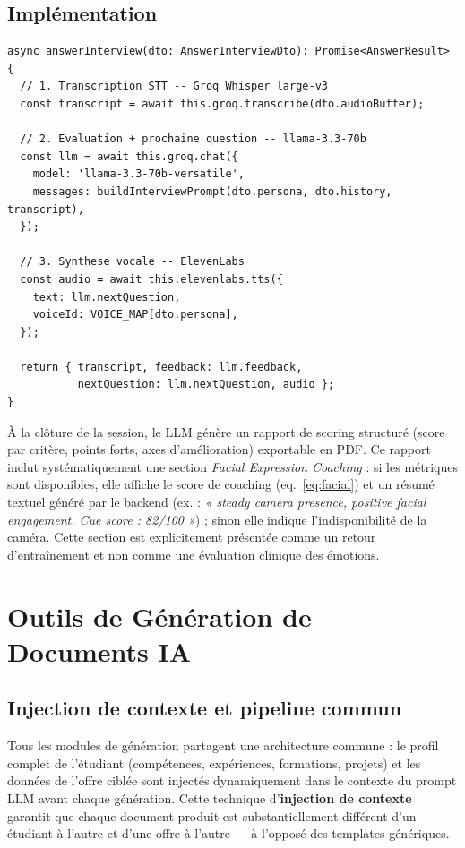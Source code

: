﻿\documentclass[12pt,a4paper]{report}
\begin{document}
\subsection{Implémentation}

\begin{lstlisting}[style=ts, caption={Orchestration STT → LLM → TTS dans le handler d'entretien}]
async answerInterview(dto: AnswerInterviewDto): Promise<AnswerResult> {
  // 1. Transcription STT -- Groq Whisper large-v3
  const transcript = await this.groq.transcribe(dto.audioBuffer);

  // 2. Evaluation + prochaine question -- llama-3.3-70b
  const llm = await this.groq.chat({
    model: 'llama-3.3-70b-versatile',
    messages: buildInterviewPrompt(dto.persona, dto.history, transcript),
  });

  // 3. Synthese vocale -- ElevenLabs
  const audio = await this.elevenlabs.tts({
    text: llm.nextQuestion,
    voiceId: VOICE_MAP[dto.persona],
  });

  return { transcript, feedback: llm.feedback,
           nextQuestion: llm.nextQuestion, audio };
}
\end{lstlisting}

À la clôture de la session, le \ac{LLM} génère un rapport de scoring structuré (score par critère, points forts, axes d'amélioration) exportable en PDF. Ce rapport inclut systématiquement une section \textit{Facial Expression Coaching} : si les métriques sont disponibles, elle affiche le score de coaching (eq.~\ref{eq:facial}) et un résumé textuel généré par le backend (ex. : \textit{« steady camera presence, positive facial engagement. Cue score : 82/100 »}) ; sinon elle indique l'indisponibilité de la caméra. Cette section est explicitement présentée comme un retour d'entraînement et non comme une évaluation clinique des émotions.

\section{Outils de Génération de Documents IA}

\subsection{Injection de contexte et pipeline commun}

Tous les modules de génération partagent une architecture commune : le profil complet de l'étudiant (compétences, expériences, formations, projets) et les données de l'offre ciblée sont injectés dynamiquement dans le contexte du prompt LLM avant chaque génération. Cette technique d'\textbf{injection de contexte} garantit que chaque document produit est substantiellement différent d'un étudiant à l'autre et d'une offre à l'autre — à l'opposé des templates génériques.
\end{document}
